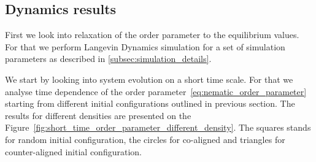 \subsection{Dynamics results}
\label{subsec:molecular_dynamics_results}

First we look into relaxation of the order parameter to the equilibrium values. For that we perform Langevin Dynamics simulation for a set of simulation parameters as described in \ref{subsec:simulation_details}.




We start by looking into system evolution on a short time scale. For that we analyse time dependence of the order parameter~\eqref{eq:nematic_order_parameter} starting from different initial configurations outlined in previous section. The results for different densities are presented on the Figure~\ref{fig:short_time_order_parameter_different_density}. The squares stands for random initial configuration, the circles for co-aligned and triangles for counter-aligned initial configuration.


